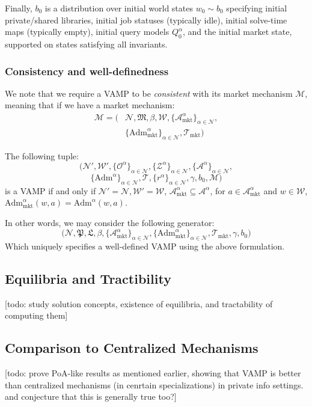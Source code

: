 
Finally, $b_0$ is a distribution over initial world states $w_0\sim b_0$ specifying initial private/shared libraries, initial job statuses
(typically idle), initial solve-time maps (typically empty), initial query models $Q^\alpha_0$, and the initial market state, supported on
states satisfying all invariants.

\subsubsection{Consistency and well-definedness}

We note that we require a VAMP to be \textit{consistent} with its market mechanism $\mathscr{M}$, meaning that if we have a market mechanism:
\begin{align*}
\mathscr{M} =\Big(&\mathcal{N}, \mathfrak{M},\beta, \mathcal{W},\{\mathcal{A}^\alpha_{\mathrm{mkt}}\}_{\alpha\in\mathcal{N}},
\\&\{\mathrm{Adm}^\alpha_{\mathrm{mkt}}\}_{\alpha\in\mathcal{N}},\mathcal{T}_{\mathrm{mkt}}\Big)
\end{align*}

The following tuple:
\[
\Big(\mathcal{N}',\mathcal{W}',\{\mathcal{O}^\alpha\}_{\alpha\in\mathcal{N}},\{\mathcal{Z}^\alpha\}_{\alpha\in\mathcal{N}},\{\mathcal{A}^\alpha\}_{\alpha\in\mathcal{N}},
\]\[\{\mathrm{Adm}^\alpha\}_{\alpha\in\mathcal{N}},\mathcal{T},
\{r^\alpha\}_{\alpha\in\mathcal{N}},\gamma,b_0, \mathscr{M}\Big)
\]
is a VAMP if and only if $\mathcal N' = \mathcal N, \mathcal W' = \mathcal W$, $\mathcal{A}^\alpha_\mathrm{mkt}\subseteq\mathcal{A}^\alpha$, for $a \in \mathcal{A}^\alpha_\mathrm{mkt}$ and $w \in \mathcal W$,$\mathrm{Adm}^\alpha_\mathrm{mkt}(w,a)=\mathrm{Adm}^\alpha(w,a)$. 

In other words, we may consider the following generator:
\[
\Big(
\mathcal{N},\mathfrak{P},\mathfrak{L}, \beta, \{\mathcal{A}^\alpha_{\mathrm{mkt}}\}_{\alpha\in\mathcal{N}},\{\mathrm{Adm}^\alpha_{\mathrm{mkt}}\}_{\alpha\in\mathcal{N}},\mathcal{T}_{\mathrm{mkt}},\gamma,b_0
\Big)
\]
Which uniquely specifies a well-defined VAMP using the above formulation.


\subsection{Equilibria and Tractibility}

[todo: study solution concepts, existence of equilibria, and tractability of computing them]

\subsection{Comparison to Centralized Mechanisms}


[todo: prove PoA-like results as mentioned earlier, showing that VAMP is better than centralized mechanisms (in cenrtain specializations) in private info settings. and conjecture that this is generally true too?]